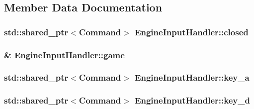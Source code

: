 \subsection{Member Data Documentation}
\hypertarget{class_engine_input_handler_a0795da79edb03ad26aa5d8aec9fc2a04}{}
\subsubsection[{closed}]{\setlength{\rightskip}{0pt plus 5cm}std\+::shared\+\_\+ptr$<${\bf Command}$>$ Engine\+Input\+Handler\+::closed\hspace{0.3cm}{\ttfamily [private]}}\label{class_engine_input_handler_a0795da79edb03ad26aa5d8aec9fc2a04}
\hypertarget{class_engine_input_handler_a449d615b9968227381db153f57b7299d}{}
\subsubsection[{game}]{\& Engine\+Input\+Handler\+::game\hspace{0.3cm}{\ttfamily [private]}}\label{class_engine_input_handler_a449d615b9968227381db153f57b7299d}
\hypertarget{class_engine_input_handler_ae2da02fb4013bf0e85c951ad16efd48a}{}
\subsubsection[{key\+\_\+a}]{\setlength{\rightskip}{0pt plus 5cm}std\+::shared\+\_\+ptr$<${\bf Command}$>$ Engine\+Input\+Handler\+::key\+\_\+a\hspace{0.3cm}{\ttfamily [private]}}\label{class_engine_input_handler_ae2da02fb4013bf0e85c951ad16efd48a}
\hypertarget{class_engine_input_handler_a54e54d55b3fb0b52efcebe616849cdd1}{}
\subsubsection[{key\+\_\+d}]{\setlength{\rightskip}{0pt plus 5cm}std\+::shared\+\_\+ptr$<${\bf Command}$>$ Engine\+Input\+Handler\+::key\+\_\+d\hspace{0.3cm}{\ttfamily [private]}}\label{class_engine_input_handler_a54e54d55b3fb0b52efcebe616849cdd1}
\hypertarget{class_engine_input_handler_a6812313632a9cf68132b99b4179ab1a4}{}
